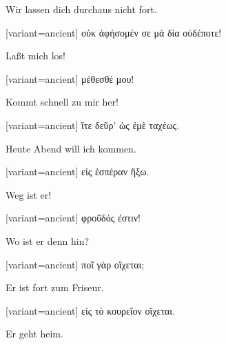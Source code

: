 Wir lassen dich durchaus nicht fort.

\switchcolumn

\begin{greek}[variant=ancient]%
οὐκ ἀφήσομέν σε μά δία οὐδέποτε!

\end{greek}%
\switchcolumn*

Laßt mich los!

\switchcolumn

\begin{greek}[variant=ancient]%
μέθεσθέ μου!

\end{greek}%
\switchcolumn*

Kommt schnell zu mir her!

\switchcolumn

\begin{greek}[variant=ancient]%
ἴτε δεῦρ' ὡς ἐμὲ ταχέως.

\end{greek}%
\switchcolumn*

Heute Abend will ich kommen.

\switchcolumn

\begin{greek}[variant=ancient]%
εἰς ἑσπέραν ἥξω.

\end{greek}%
\switchcolumn*

Weg ist er!

\switchcolumn

\begin{greek}[variant=ancient]%
φροῦδός ἐστιν!

\end{greek}%
\switchcolumn*

Wo ist er denn hin?

\switchcolumn

\begin{greek}[variant=ancient]%
ποῖ γὰρ οἴχεται;

\end{greek}%
\switchcolumn*

Er ist fort zum Friseur.

\switchcolumn

\begin{greek}[variant=ancient]%
εἰς τὸ κουρεῖον οἴχεται.

\end{greek}%
\switchcolumn*

Er geht heim.

\switchcolumn

